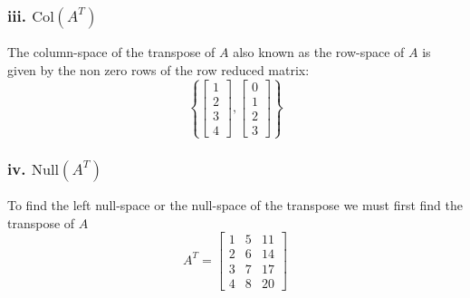\documentclass{article}
\begin{document}
\subsubsection*{iii. \textit{$\text{Col}(A^T)$}}
The column-space of the transpose of $A$ also known as the row-space of $A$ is given by the non zero rows of the row reduced matrix: $$\left\{\begin{bmatrix}
    1\\2\\3\\4
\end{bmatrix},\begin{bmatrix}
    0\\1\\2\\3
\end{bmatrix}\right\}$$
\newpage
\subsubsection*{iv. \textit{$\text{Null}(A^T)$}}
To find the left null-space or the null-space of the transpose we must first find the transpose of $A$ $$A^T=\begin{bmatrix}
    1 & 5 & 11\\
    2 & 6 & 14\\
    3 & 7 & 17\\
    4 & 8 & 20
\end{bmatrix}$$
\end{document}
